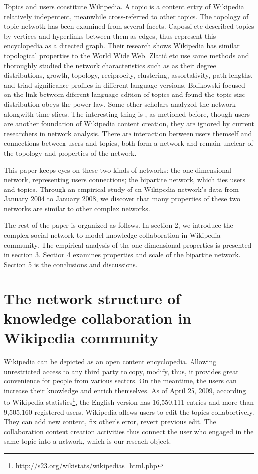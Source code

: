 \documentclass{elsarticle}
\begin{document}
Topics and users constitute  Wikipedia. A topic is a content entry
of Wikipedia relatively indepentent, meanwhile
cross-referred to other topics. The topology of topic netwotk  has
been examined
 from several facets. Capossi etc described topics by vertices and hyperlinks between them as edges, thus represent
this encyclopedia as a directed graph\cite{capocci-2006}. Their research shows Wikipedia has
similar topological properties  to the World Wide Web. Zlati\'{c} etc use
same methods and thoroughly studied the network characteristics such as as their degree distributions, growth, topology, reciprocity, clustering, assortativity, path lengths, and triad
signiﬁcance proﬁles in different language versions\cite{zlatic:016115}. Bolikowski
focused on  the link between diferent language edition of topics and found
the topic size distribution obeys the power
law\cite{bolikowski-2009}. Some other scholars analyzed
the network alongwith time slices\cite{buriol2006taw}. The interesting thing is
, as metioned before, though users are another foundation of Wikipedia
content creation, they are ignored by current researchers in network
analysis. There are interaction between users themself and connections
between users and topics, both form a network and remain unclear of the topology and
properties of the network.    



 This paper keeps eyes  on these two kinds of networks: the
 one-dimensional network, representing users connections; the
 bipartite network, which ties users and topics. Through an
 empirical study of en-Wikipedia network’s data  from January
 2004 to January 2008, we discover that many properties of these two
 networks are similar to other complex networks. 

The rest of the paper is organized as follows. In section 2, we
introduce the complex social network to model  knowledge
collaboration in Wikipedia community. The empirical analysis of the one-dimensional
properties is presented in section 3. Section 4 examines properties
and scale of the  bipartite network. Section 5 is
the conclusions and discussions.

\section{The network structure of knowledge collaboration in Wikipedia
community}
\label{sec:netw-struct-wiki}

 Wikipedia
can be depicted as an open content encyclopedia. Allowing unrestricted access to any third party to copy, modify,
thus, it  provides great convenience for people from various
sectors. On the meantime, the users can increase their knowledge and
enrich themselves. As of April 25, 2009, according to Wikipedia
statistics\footnote{http://s23.org/wikistats/wikipedias\_html.php}, the English version has
16,550,111 entries and more than  9,505,160 registered users. Wikipedia allows users to edit the topics collabortively. They can add
new content, fix other's error, revert previous edit. The
collaboration content creation activities thus connect the user who
engaged in the same topic into a network, which is our reseach object. 
\end{document}

